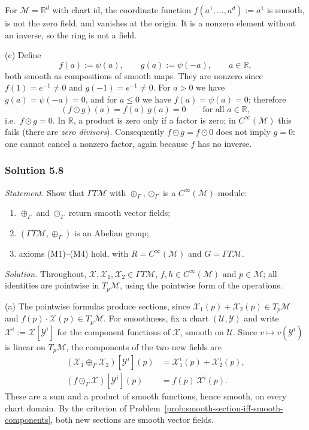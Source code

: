 \documentclass[11pt]{article}
\newcommand{\TpM}{T_p\mathcal M}
\newcommand{\Cinf}{C^\infty(\mathcal M)}
\begin{document}
For $\mathcal M=\mathbb R^d$ with chart $\mathrm{id}$, the coordinate
function $f(a^1,\dots,a^d):=a^1$ is smooth, is not the zero field, and
vanishes at the origin. It is a nonzero element without an inverse, so the
ring is not a field.

(c) Define
\[
f(a):=\psi(a),\qquad g(a):=\psi(-a),\qquad a\in\mathbb R,
\]
both smooth as compositions of smooth maps. They are nonzero since
$f(1)=e^{-1}\neq0$ and $g(-1)=e^{-1}\neq0$. For $a>0$ we have
$g(a)=\psi(-a)=0$, and for $a\le0$ we have $f(a)=\psi(a)=0$; therefore
\[
(f\odot g)(a)=f(a)\,g(a)=0\qquad\text{for all }a\in\mathbb R,
\]
i.e.\ $f\odot g=0$. In $\mathbb R$, a product is zero only if a factor is
zero; in $\Cinf$ this fails (there are \emph{zero divisors}). Consequently
$f\odot g=f\odot0$ does not imply $g=0$: one cannot cancel a nonzero
factor, again because $f$ has no inverse.

\subsubsection*{Solution 5.8}

\noindent\textit{Statement.} Show that $\Gamma T\mathcal M$ with
$\oplus_\Gamma,\odot_\Gamma$ is a $\Cinf$-module:
\begin{enumerate}[label=(\alph*)]
  \item $\oplus_\Gamma$ and $\odot_\Gamma$ return smooth vector fields;
  \item $(\Gamma T\mathcal M,\oplus_\Gamma)$ is an Abelian group;
  \item axioms (M1)--(M4) hold, with $R=\Cinf$ and $G=\Gamma T\mathcal M$.
\end{enumerate}

\medskip
\noindent\textit{Solution.} Throughout, $\mathcal X,\mathcal X_1,\mathcal
X_2\in\Gamma T\mathcal M$, $f,h\in\Cinf$ and $p\in\mathcal M$; all
identities are pointwise in $\TpM$, using the pointwise form of the
operations.

(a) The pointwise formulas produce sections, since
$\mathcal X_1(p)+\mathcal X_2(p)\in\TpM$ and $f(p)\cdot\mathcal X(p)\in\TpM$.
For smoothness, fix a chart $(\mathcal U,\mathcal Y)$ and write $\mathcal
X^i:=\mathcal X[\mathcal Y^i]$ for the component functions of $\mathcal X$,
smooth on $\mathcal U$. Since $v\mapsto v(\mathcal Y^i)$ is linear on
$\TpM$, the components of the two new fields are
\begin{align*}
(\mathcal X_1\oplus_\Gamma\mathcal X_2)[\mathcal Y^i](p) &= \mathcal X_1^i(p)+\mathcal X_2^i(p),\\
(f\odot_\Gamma\mathcal X)[\mathcal Y^i](p) &= f(p)\,\mathcal X^i(p).
\end{align*}
These are a sum and a product of smooth functions, hence smooth, on every
chart domain. By the criterion of Problem~\ref{prob:smooth-section-iff-smooth-components},
both new sections are smooth vector fields.
\end{document}
